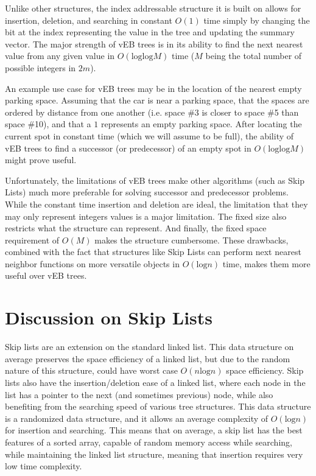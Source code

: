 \documentclass{article}
\begin{document}
Unlike other structures, the index addressable structure it is built on allows for insertion, deletion, and searching in constant $O(1)$ time simply by changing the bit at the index representing the value in the tree and updating the summary vector. The major strength of vEB trees is in its ability to find the next nearest value from any given value in $O(\text{log}\text{log} M)$ time ($M$ being the total number of possible integers in $2m$).

An example use case for vEB trees may be in the location of the nearest empty parking space. Assuming that the car is near a parking space, that the spaces are ordered by distance from one another (i.e. space \#3 is closer to space \#5 than space \#10), and that a $1$ represents an empty parking space. After locating the current spot in constant time (which we will assume to be full), the ability of vEB trees to find a successor (or predecessor) of an empty spot in $O(\text{log}\text{log} M)$ might prove useful.

Unfortunately, the limitations of vEB trees make other algorithms (such as Skip Lists) much more preferable for solving successor and predecessor problems. While the constant time insertion and deletion are ideal, the limitation that they may only represent integers values is a major limitation. The fixed size also restricts what the structure can represent. And finally, the fixed space requirement of $O(M)$ makes the structure cumbersome. These drawbacks, combined with the fact that structures like Skip Lists can perform next nearest neighbor functions on more versatile objects in $O(\text{log} n)$ time, makes them more useful over vEB trees.

\pagebreak

\section*{Discussion on Skip Lists}

Skip lists are an extension on the standard linked list. This data structure on average preserves the space efficiency of a linked list, but due to the random nature of this structure, could have worst case $O(n \text{log} n)$ space efficiency. Skip lists also have the insertion/deletion ease of a linked list, where each node in the list has a pointer to the next (and sometimes previous) node, while also benefiting from the searching speed of various tree structures. This data structure is a randomized data structure, and it allows an average complexity of $O(\text{log} n)$ for insertion and searching. This means that on average, a skip list has the best features of a sorted array, capable of random memory access while searching, while maintaining the linked list structure, meaning that insertion requires very low time complexity. 
\end{document}
